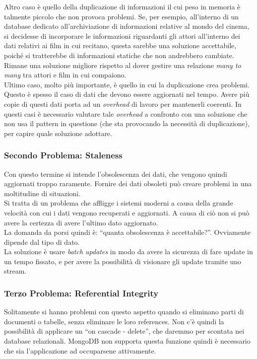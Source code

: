\noindent Altro caso è quello della duplicazione di informazioni il cui peso in memoria è talmente piccolo che non provoca problemi. Se, per esempio, all'interno di un database dedicato all'archiviazione di informazioni relative al mondo del cinema, si decidesse di incorporare le informazioni riguardanti gli attori all'interno dei dati relativi ai film in cui recitano, questa sarebbe una soluzione accettabile, poiché si tratterebbe di informazioni statiche che non andrebbero cambiate. Rimane una soluzione migliore rispetto al dover gestire una relazione \textit{many to many} tra attori e film in cui compaiono.\\

\noindent Ultimo caso, molto più importante, è quello in cui la duplicazione crea problemi.\\
Questo è spesso il caso di dati che devono essere aggiornati nel tempo. Avere più copie di questi dati porta ad un \textit{overhead} di lavoro per mantenerli coerenti. In questi casi è necessario valutare tale \textit{overhead} a confronto con una soluzione che non usa il pattern in questione (che sta provocando la necessità di duplicazione), per capire quale soluzione adottare.\\

\subsubsection{Secondo Problema: Staleness}
Con questo termine si intende l'obsolescenza dei dati, che vengono quindi aggiornati troppo raramente. Fornire dei dati obsoleti può creare problemi in una moltitudine di situazioni.\\
Si tratta di un problema che affligge i sistemi moderni a causa della grande velocità con cui i dati vengono recuperati e aggiornati. A causa di ciò non si può avere la certezza di avere l'ultimo dato aggiornato.\\
La domanda da porsi quindi è: ``quanta obsolescenza è accettabile?''. Ovviamente dipende dal tipo di dato.\\
La soluzione è usare \textit{batch updates} in modo da avere la sicurezza di fare update in un tempo fissato, e per avere la possibilità di visionare gli update tramite uno stream.\\

\subsubsection{Terzo Problema: Referential Integrity}
Solitamente si hanno problemi con questo aspetto quando si eliminano parti di documenti o tabelle, senza eliminare le loro references. Non c'è quindi la possibilità di applicare un ``on cascade - delete'', che daremmo per scontata nei database relazionali. MongoDB non supporta questa funzione quindi è necessario che sia l'applicazione ad occuparsene attivamente.\\\\

